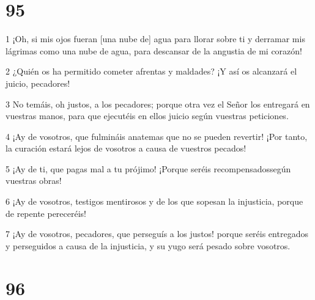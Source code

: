\chapter{95}

\par 1 ¡Oh, si mis ojos fueran [una nube de] agua para llorar sobre ti y derramar mis lágrimas como una nube de agua, para descansar de la angustia de mi corazón!
\par 2 ¿Quién os ha permitido cometer afrentas y maldades? ¡Y así os alcanzará el juicio, pecadores!
\par 3 No temáis, oh justos, a los pecadores; porque otra vez el Señor los entregará en vuestras manos, para que ejecutéis en ellos juicio según vuestras peticiones.
\par 4 ¡Ay de vosotros, que fulmináis anatemas que no se pueden revertir! ¡Por tanto, la curación estará lejos de vosotros a causa de vuestros pecados!
\par 5 ¡Ay de ti, que pagas mal a tu prójimo! ¡Porque seréis recompensados ​​según vuestras obras!
\par 6 ¡Ay de vosotros, testigos mentirosos y de los que sopesan la injusticia, porque de repente pereceréis!
\par 7 ¡Ay de vosotros, pecadores, que perseguís a los justos! porque seréis entregados y perseguidos a causa de la injusticia, y su yugo será pesado sobre vosotros.

\chapter{96}

